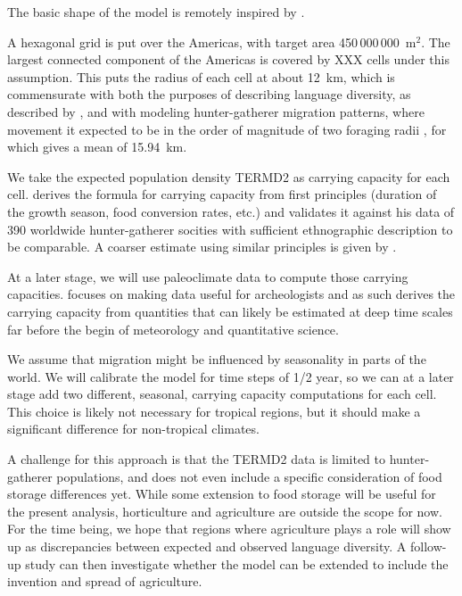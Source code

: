 \documentclass[a4paper,12pt]{scrartcl}
\begin{document}
The basic shape of the model is remotely inspired by
\textcite{gavin2017processbased}.

A hexagonal grid is put over the Americas, with target area 450\,000\,000~m$^2$.
The largest connected component of the Americas is covered by XXX cells under
this assumption.
This puts the radius of each cell at about 12~km, which is commensurate with
both the purposes of describing language diversity, as described by
\textcite{gavin2017processbased}, and with modeling hunter-gatherer migration
patterns, where movement it expected to be in the order of magnitude of two
foraging radii \parencite{grove2009hunter}, for which \textcite[Table
7.13]{binford2001constructing} gives a mean of 15.94~km.

We take the expected population density TERMD2 \parencite[Formula
6.15]{binford2001constructing} as carrying capacity for each cell.
 derives the formula for carrying capacity
from first principles (duration of the growth season, food conversion rates,
etc.) and validates it against his data of 390 worldwide hunter-gatherer
socities with sufficient ethnographic description to be comparable. A coarser
estimate using similar principles is given by \textcite{tallavaara2015human}.

At a later stage, we will use paleoclimate data to compute those carrying
capacities.  focuses on making data useful for
archeologists and as such derives the carrying capacity from quantities that can
likely be estimated at deep time scales far before the begin of meteorology and
quantitative science.


We assume that migration might be influenced by seasonality in parts of the world. We will calibrate
the model for time steps of 1/2 year, so we can at a later stage add two
different, seasonal, carrying capacity computations for each cell.
This choice is likely not necessary for tropical regions, but it should make a
significant difference for non-tropical climates.

A challenge for this approach is that the TERMD2 data is limited to
hunter-gatherer populations, and does not even include a specific consideration
of food storage differences yet. While some extension to food storage will be
useful for the present analysis, horticulture and agriculture are outside the
scope for now. For the time being, we hope that regions where agriculture plays a
role will show up as discrepancies between expected and observed language
diversity. A follow-up study can then investigate whether the model can be
extended to include the invention and spread of agriculture.
\end{document}
